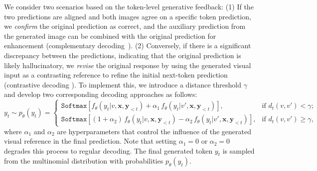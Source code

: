 We consider two scenarios based on the token-level generative feedback: (1) If the two predictions are aligned and both images agree on a specific token prediction, we \textit{confirm} the original prediction as correct, and the auxiliary prediction from the generated image can be combined with the original prediction for enhancement (complementary decoding~\citep{woo2024ritual}). (2) Conversely, if there is a significant discrepancy between the predictions, indicating that the original prediction is likely hallucinatory, we \textit{revise} the original response by using the generated visual input as a contrasting reference to refine the initial next-token prediction (contrastive decoding \citep{leng2024mitigating}). To implement this, we introduce a distance threshold $\gamma$ and develop two corresponding decoding approaches as follows:
\begin{equation}
y_t \sim p_{\theta}(y_t) = 
\begin{cases} 
\mathtt{Softmax}\left[f_\theta(y_{t}| v,\mathbf{x},\mathbf{y}_{<t}) + \alpha_{1} \, f_\theta(y_{t}| v',\mathbf{x},\mathbf{y}_{<t})\right], & \text{if } d_t(v, v') < \gamma; \\[5pt]
\mathtt{Softmax}\left[(1 + \alpha_{2}) \, f_\theta(y_{t}| v,\mathbf{x},\mathbf{y}_{<t}) - \alpha_{2} \, f_\theta(y_{t}| v',\mathbf{x},\mathbf{y}_{<t})\right], & \text{if } d_t(v, v') \geq \gamma,
\end{cases}
\end{equation}
where $\alpha_1$ and $\alpha_2$ are hyperparameters that control the influence of the generated visual reference in the final prediction. Note that setting $\alpha_1=0$ or $\alpha_2=0$ degrades this process to regular decoding. The final generated token $y_t$ is sampled from the multinomial distribution with probabilities $p_{\theta}(y_t)$.



